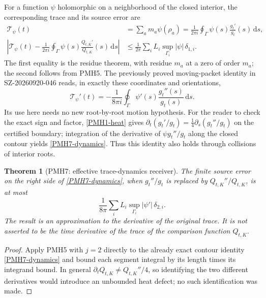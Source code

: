 \documentclass[11pt]{article}
\newtheorem{theorem}{Theorem}
\newcommand{\dd}{\,\mathrm d}
\begin{document}
For a function $\psi$ holomorphic on a neighborhood of the closed
interior, the corresponding trace and its source error are
\begin{align}
 \mathscr T_\psi(t)&=\sum_am_a\psi(\rho_a)
    =\frac1{2\pi i}\oint_\Gamma\psi(s)\frac{g_t'}{g_t}(s)\dd s,
 \label{PMH7-trace}\\
 \left|\mathscr T_\psi(t)-\frac1{2\pi i}
 \oint_\Gamma\psi(s)\frac{Q_{t,K}'}{Q_{t,K}}(s)\dd s\right|
 &\le\frac1{2\pi}\sum_iL_i\sup_{\Gamma_i}|\psi|\,\delta_{1,i}.
 \label{PMH7-traceerror}
\end{align}
The first equality is the residue theorem, with residue $m_a$ at a
zero of order $m_a$; the second follows from PMH5. The previously
proved moving-packet identity in SZ-20260920-046 reads, in exactly
these coordinates and orientations,
\begin{equation}\label{PMH7-dynamics}
 \mathscr T_\psi'(t)=-\frac1{8\pi i}\oint_\Gamma
       \psi'(s)\frac{g_t''(s)}{g_t(s)}\dd s.
\end{equation}
Its use here needs no new root-by-root motion hypothesis. For the
reader to check the exact sign and factor, \eqref{PMH1-heat} gives
$\partial_t(g_t'/g_t)=\tfrac14\partial_s(g_t''/g_t)$ on the
certified boundary; integration of the derivative of
$\psi g_t''/g_t$ along the closed contour yields
\eqref{PMH7-dynamics}. Thus this identity also holds through
collisions of interior roots.

\begin{theorem}[PMH7: effective trace-dynamics receiver]
\label{PMH7}
The finite source error on the right side of
\eqref{PMH7-dynamics}, when $g_t''/g_t$ is replaced by
$Q_{t,K}''/Q_{t,K}$, is at most
\begin{equation}\label{PMH7-timeerror}
 \frac1{8\pi}\sum_iL_i\sup_{\Gamma_i}|\psi'|\,\delta_{2,i}.
\end{equation}
The result is an approximation to the derivative of the original
trace. It is not asserted to be the time derivative of the trace
of the comparison function $Q_{t,K}$.
\end{theorem}
\begin{proof}
Apply PMH5 with $j=2$ directly to the already exact contour
identity \eqref{PMH7-dynamics} and bound each segment integral by
its length times its integrand bound. In general
$\partial_tQ_{t,K}\ne Q_{t,K}''/4$, so identifying the two
different derivatives would introduce an unbounded heat defect;
no such identification was made.
\end{proof}
\end{document}
